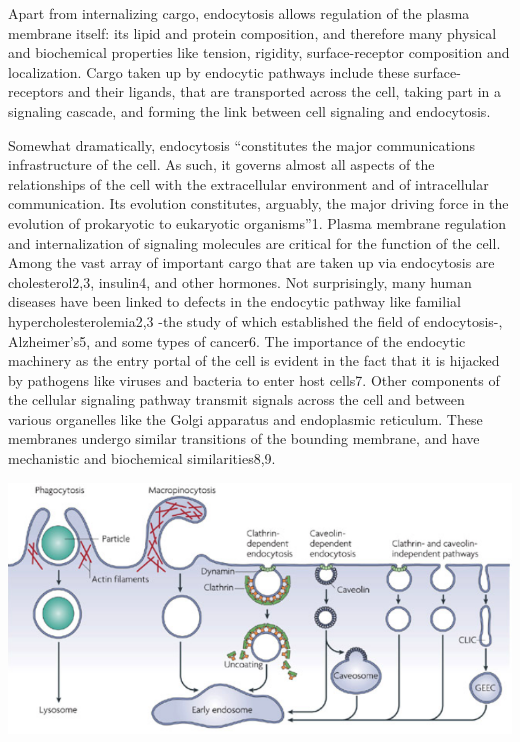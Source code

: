 Apart from internalizing cargo, endocytosis allows regulation of the plasma membrane itself: its lipid and protein composition, and therefore many physical and biochemical properties like tension, rigidity, surface-receptor composition and localization. Cargo taken up by endocytic pathways include these surface-receptors and their ligands, that are transported across the cell, taking part in a signaling cascade, and forming the link between cell signaling and endocytosis.


\vspace{5mm}
Somewhat dramatically, endocytosis “constitutes the major communications infrastructure of the cell. As such, it governs almost all aspects of the relationships of the cell with the extracellular environment and of intracellular communication. Its evolution constitutes, arguably, the major driving force in the evolution of prokaryotic to eukaryotic organisms”1.  Plasma membrane regulation and internalization of signaling molecules are critical for the function of the cell. Among the vast array of important cargo that are taken up via endocytosis are cholesterol2,3, insulin4, and other hormones. Not surprisingly, many human diseases have been linked to defects in the endocytic pathway like familial hypercholesterolemia2,3 -the study of which established the field of endocytosis-, Alzheimer’s5, and some types of cancer6. The importance of the endocytic machinery as the entry portal of the cell is evident in the fact that it is hijacked by pathogens like viruses and bacteria to enter host cells7. Other components of the cellular signaling pathway transmit signals across the cell and between various organelles like the Golgi apparatus and endoplasmic reticulum. These membranes undergo similar transitions of the bounding membrane, and have mechanistic and biochemical similarities8,9. 

\includegraphics[scale=0.39]{figures/intro/fig2_screenshot}
\vspace{5mm}


